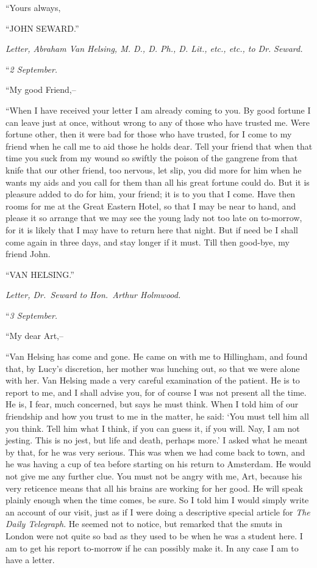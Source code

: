 \documentclass[12pt,openright]{book}
\begin{document}
“Yours always,

“JOHN SEWARD.”

\textit{Letter, Abraham Van Helsing, M. D., D. Ph., D. Lit., etc., etc., to Dr.}\textit{ }\textit{Seward.}

“\textit{2 September.}

“My good Friend,–

“When I have received your letter I am already coming to you. By good fortune I can leave just at once, without wrong to any of those who have trusted me. Were fortune other, then it were bad for those who have trusted, for I come to my friend when he call me to aid those he holds dear. Tell your friend that when that time you suck from my wound so swiftly the poison of the gangrene from that knife that our other friend, too nervous, let slip, you did more for him when he wants my aids and you call for them than all his great fortune could do. But it is pleasure added to do for him, your friend; it is to you that I come. Have then rooms for me at the Great Eastern Hotel, so that I may be near to hand, and please it so arrange that we may see the young lady not too late on to-morrow, for it is likely that I may have to return here that night. But if need be I shall come again in three days, and stay longer if it must. Till then good-bye, my friend John.

“VAN HELSING.”

\textit{Letter, Dr. Seward to Hon. Arthur Holmwood.}

“\textit{3 September.}

“My dear Art,–

“Van Helsing has come and gone. He came on with me to Hillingham, and found that, by Lucy’s discretion, her mother was lunching out, so that we were alone with her. Van Helsing made a very careful examination of the patient. He is to report to me, and I shall advise you, for of course I was not present all the time. He is, I fear, much concerned, but says he must think. When I told him of our friendship and how you trust to me in the matter, he said: ‘You must tell him all you think. Tell him what I think, if you can guess it, if you will. Nay, I am not jesting. This is no jest, but life and death, perhaps more.’ I asked what he meant by that, for he was very serious. This was when we had come back to town, and he was having a cup of tea before starting on his return to Amsterdam. He would not give me any further clue. You must not be angry with me, Art, because his very reticence means that all his brains are working for her good. He will speak plainly enough when the time comes, be sure. So I told him I would simply write an account of our visit, just as if I were doing a descriptive special article for \textit{The Daily Telegraph}. He seemed not to notice, but remarked that the smuts in London were not quite so bad as they used to be when he was a student here. I am to get his report to-morrow if he can possibly make it. In any case I am to have a letter.
\end{document}
